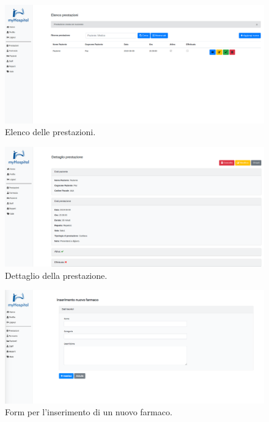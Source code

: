 \documentclass[paper=a4, fontsize=11pt,x11names]{report}
\begin{document}
\begin{landscape}
\begin{figure}[H]
\begin{center}
\includegraphics[scale=0.6]{grafica/ElencoPrestazioni}
\caption{Elenco delle prestazioni.}
\end{center}
\end{figure}
\end{landscape}

\begin{landscape}
\begin{figure}[H]
\begin{center}
\includegraphics[scale=0.6]{grafica/DettaglioPrestazione}
\caption{Dettaglio della prestazione.}
\end{center}
\end{figure}
\end{landscape}

\begin{landscape}
\begin{figure}[H]
\begin{center}
\includegraphics[scale=0.41]{grafica/NuovoFarmaco}
\caption{Form per l'inserimento di un nuovo farmaco.}
\end{center}
\end{figure}
\end{landscape}



\end{document}

